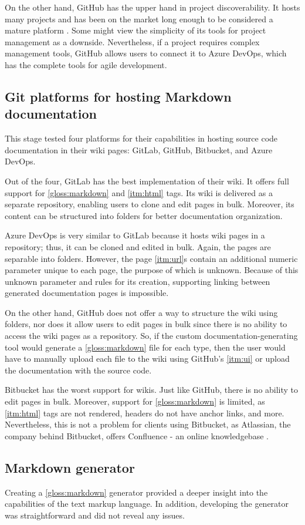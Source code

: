 On the other hand, GitHub has the upper hand in project discoverability. It hosts many projects and has been on the market long enough to be considered a mature platform \cite{daniel_github_2022}. Some might view the simplicity of its tools for project management as a downside. Nevertheless, if a project requires complex management tools, GitHub allows users to connect it to Azure DevOps, which has the complete tools for agile development.

\subsection{Git platforms for hosting Markdown documentation}

This stage tested four platforms for their capabilities in hosting source code documentation in their wiki pages: GitLab, GitHub, Bitbucket, and Azure DevOps.

Out of the four, GitLab has the best implementation of their wiki. It offers full support for \ref{gloss:markdown} and \ref{itm:html} tags.
Its wiki is delivered as a separate repository, enabling users to clone and edit pages in bulk. Moreover, its content can be structured into folders for better documentation organization.

Azure DevOps is very similar to GitLab because it hosts wiki pages in a repository; thus, it can be cloned and edited in bulk. Again, the pages are separable into folders. However, the page \ref{itm:url}s contain an additional numeric parameter unique to each page, the purpose of which is unknown. Because of this unknown parameter and rules for its creation, supporting linking between generated documentation pages is impossible.

On the other hand, GitHub does not offer a way to structure the wiki using folders, nor does it allow users to edit pages in bulk since there is no ability to access the wiki pages as a repository. So, if the custom documentation-generating tool would generate a \ref{gloss:markdown} file for each type, then the user would have to manually upload each file to the wiki using GitHub's \ref{itm:ui} or upload the documentation with the source code.

Bitbucket has the worst support for wikis.
Just like GitHub, there is no ability to edit pages in bulk.
Moreover, support for \ref{gloss:markdown} is limited, as \ref{itm:html} tags are not rendered, headers do not have anchor links, and more.
Nevertheless, this is not a problem for clients using Bitbucket, as Atlassian, the company behind Bitbucket, offers Confluence - an online knowledgebase \cite{atlassian_confluence_nodate}.

\subsection{Markdown generator}

Creating a \ref{gloss:markdown} generator provided a deeper insight into the capabilities of the text markup language. In addition, developing the generator was straightforward and did not reveal any issues.
